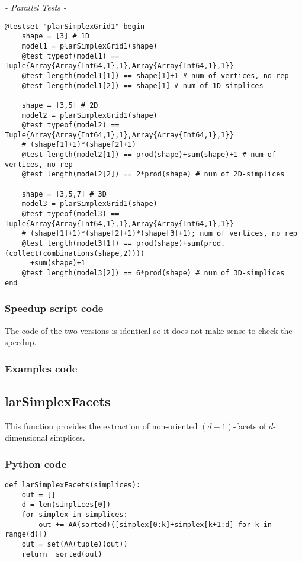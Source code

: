 \documentclass[a4paper,12pt,titlepage]{article}					%
\begin{document}
\emph{- Parallel Tests -}

\begin{Verbatim}
@testset "plarSimplexGrid1" begin
	shape = [3] # 1D
	model1 = plarSimplexGrid1(shape)
	@test typeof(model1) == Tuple{Array{Array{Int64,1},1},Array{Array{Int64,1},1}}
	@test length(model1[1]) == shape[1]+1 # num of vertices, no rep
	@test length(model1[2]) == shape[1] # num of 1D-simplices
	
	shape = [3,5] # 2D
	model2 = plarSimplexGrid1(shape)
	@test typeof(model2) == Tuple{Array{Array{Int64,1},1},Array{Array{Int64,1},1}}
	# (shape[1]+1)*(shape[2]+1)
	@test length(model2[1]) == prod(shape)+sum(shape)+1 # num of vertices, no rep
	@test length(model2[2]) == 2*prod(shape) # num of 2D-simplices
	
	shape = [3,5,7] # 3D
	model3 = plarSimplexGrid1(shape)
	@test typeof(model3) == Tuple{Array{Array{Int64,1},1},Array{Array{Int64,1},1}}
	# (shape[1]+1)*(shape[2]+1)*(shape[3]+1); num of vertices, no rep
	@test length(model3[1]) == prod(shape)+sum(prod.(collect(combinations(shape,2))))
	  +sum(shape)+1
	@test length(model3[2]) == 6*prod(shape) # num of 3D-simplices
end
\end{Verbatim}

\subsubsection{Speedup script code}
The code of the two versions is identical so it does not make sense to check the speedup.

\subsubsection{Examples code}
\lipsum[6]


\subsection{larSimplexFacets}
This function provides the extraction of non-oriented $(d-1)$-facets of $d$-dimensional simplices.

\subsubsection{Python code}
\begin{verbatim}
def larSimplexFacets(simplices):
    out = []
    d = len(simplices[0])
    for simplex in simplices:
        out += AA(sorted)([simplex[0:k]+simplex[k+1:d] for k in range(d)])
    out = set(AA(tuple)(out))
    return  sorted(out)
\end{verbatim}
\end{document}
